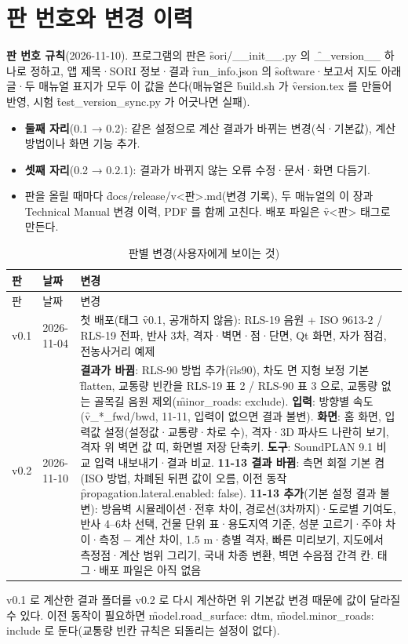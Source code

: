 \documentclass[10.5pt,a4paper]{article}
\begin{document}
\section{판 번호와 변경 이력}\label{sec:ver}
\textbf{판 번호 규칙}(2026-11-10). 프로그램의 판은 \f{sori/\_\_init\_\_.py} 의 \f{\_\_version\_\_} 하나로 정하고, 앱 제목·SORI 정보·결과 \f{run\_info.json} 의 \f{software}·보고서 지도 아래 글·두 매뉴얼 표지가 모두 이 값을 쓴다(매뉴얼은 \f{build.sh} 가 \f{version.tex} 를 만들어 반영, 시험 \f{test\_version\_sync.py} 가 어긋나면 실패).
\begin{itemize}
\item \textbf{둘째 자리}(0.1 → 0.2): 같은 설정으로 계산 결과가 바뀌는 변경(식·기본값), 계산 방법이나 화면 기능 추가.
\item \textbf{셋째 자리}(0.2 → 0.2.1): 결과가 바뀌지 않는 오류 수정·문서·화면 다듬기.
\item 판을 올릴 때마다 \f{docs/release/v<판>.md}(변경 기록), 두 매뉴얼의 이 장과 Technical Manual 변경 이력, PDF 를 함께 고친다. 배포 파일은 \f{v<판>} 태그로 만든다.
\end{itemize}

\begin{longtable}{P{14mm}P{20mm}P{118mm}}
\caption{판별 변경(사용자에게 보이는 것)}\label{tab:ver}\\
\toprule 판 & 날짜 & 변경 \\ \midrule\endfirsthead
\toprule 판 & 날짜 & 변경 \\ \midrule\endhead
v0.1 & 2026-11-04 & 첫 배포(태그 \f{v0.1}, 공개하지 않음): RLS-19 음원 + ISO 9613-2 / RLS-19 전파, 반사 3차, 격자·벽면·점·단면, Qt 화면, 자가 점검, 전농사거리 예제 \\
v0.2 & 2026-11-10 & \textbf{결과가 바뀜}: RLS-90 방법 추가(\f{rls90}), 차도 면 지형 보정 기본 \f{flatten}, 교통량 빈칸을 RLS-19 표 2 / RLS-90 표 3 으로, 교통량 없는 골목길 음원 제외(\f{minor\_roads: exclude}). \textbf{입력}: 방향별 속도(\f{v\_*\_fwd/bwd}, 11-11, 입력이 없으면 결과 불변). \textbf{화면}: 홈 화면, 입력값 설정(설정값·교통량·차로 수), 격자·3D 파사드 나란히 보기, 격자 위 벽면 값 띠, 화면별 저장 단축키. \textbf{도구}: SoundPLAN 9.1 비교 입력 내보내기·결과 비교. \textbf{11-13 결과 바뀜}: 측면 회절 기본 켬(ISO 방법, 차폐된 뒤편 값이 오름, 이전 동작 \f{propagation.lateral.enabled: false}). \textbf{11-13 추가}(기본 설정 결과 불변): 방음벽 시뮬레이션·전후 차이, 경로선(3차까지)·도로별 기여도, 반사 4–6차 선택, 건물 단위 표·용도지역 기준, 성분 고르기·주야 차이·측정 − 계산 차이, 1.5 m·층별 격자, 빠른 미리보기, 지도에서 측정점·계산 범위 그리기, 국내 차종 변환, 벽면 수음점 간격 칸. 태그·배포 파일은 아직 없음 \\
\bottomrule
\end{longtable}
v0.1 로 계산한 결과 폴더를 v0.2 로 다시 계산하면 위 기본값 변경 때문에 값이 달라질 수 있다. 이전 동작이 필요하면 \f{model.road\_surface: dtm}, \f{model.minor\_roads: include} 로 둔다(교통량 빈칸 규칙은 되돌리는 설정이 없다).
\end{document}
